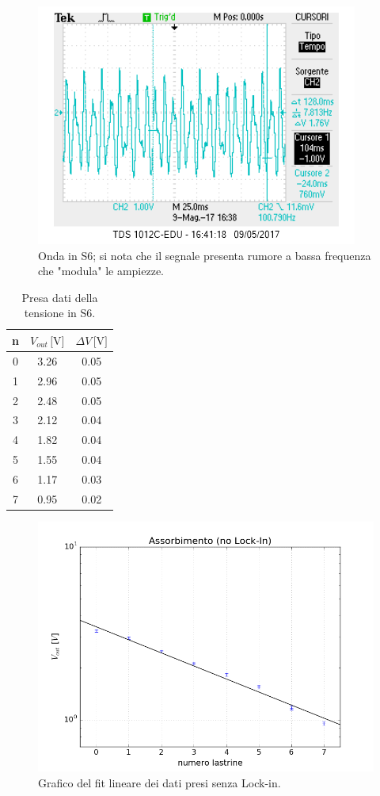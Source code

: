 \documentclass[10pt,a4paper]{article}
\begin{document}
\begin{figure}[!htb]
  \centering
  \includegraphics[scale=0.75]{S6.png}
\caption{Onda in S6; si nota che il segnale presenta rumore a bassa frequenza che "modula" le ampiezze.\label{osc:S6}}
\end{figure}

\begin{table}[!htb]
\centering
\begin{tabular}{|c|c|c|}
\hline
n	&	$V_{out}\,\mbox{[V]}$	&	$\Delta V\,\mbox{[V]}$\\
\hline
0 &  3.26  &  0.05\\
\hline
1  & 2.96  &  0.05\\
\hline
2 &  2.48  &  0.05\\
\hline
3  & 2.12   & 0.04\\
\hline
4   &1.82   & 0.04\\
\hline
5   &1.55    &0.04\\
\hline
6   &1.17   & 0.03\\
\hline
7   &0.95    & 0.02\\
\hline
\end{tabular}
\caption{Presa dati della tensione in S6.\label{tab:abs1}}
\end{table}

\begin{figure}[!htb]
  \centering
\includegraphics[scale=0.7]{plot-lin1.png}
\caption{Grafico del fit lineare dei dati presi senza Lock-in.\label{plot1}}
\end{figure}
\end{document}
